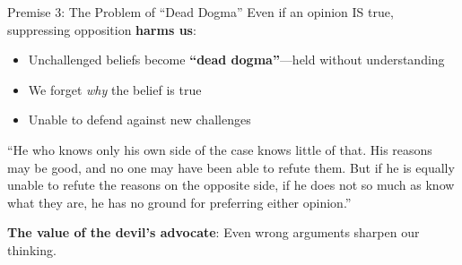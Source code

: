 ﻿\documentclass[aspectratio=169]{beamer}
\begin{document}
\begin{frame}{Premise 3: The Problem of ``Dead Dogma''}
Even if an opinion IS true, suppressing opposition \textbf{harms us}:

\begin{itemize}
    \item Unchallenged beliefs become \textbf{``dead dogma''}---held without understanding
    \item We forget \textit{why} the belief is true
    \item Unable to defend against new challenges
\end{itemize}

\vspace{0.3cm}
\begin{quotebox}[Mill]
``He who knows only his own side of the case knows little of that. His reasons may be good, and no one may have been able to refute them. But if he is equally unable to refute the reasons on the opposite side, if he does not so much as know what they are, he has no ground for preferring either opinion.''
\end{quotebox}

\vspace{0.2cm}
\textbf{The value of the devil's advocate}: Even wrong arguments sharpen our thinking.
\end{frame}
\end{document}
